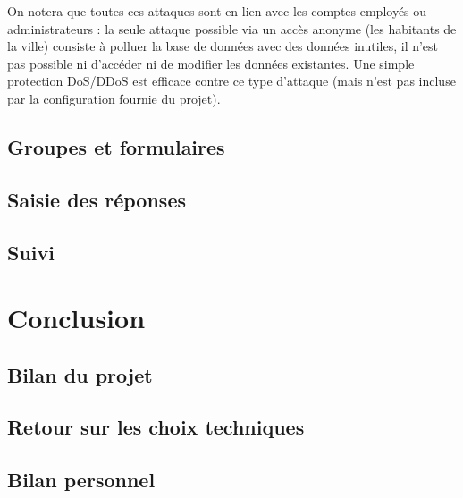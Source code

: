 \documentclass[11pt,french]{memoir}
\begin{document}
	On notera que toutes ces attaques sont en lien avec les comptes employés ou administrateurs : la seule attaque possible via un accès anonyme (les habitants de la ville) consiste à polluer la base de données avec des données inutiles, il n’est pas possible ni d’accéder ni de modifier les données existantes.
	Une simple protection DoS/DDoS est efficace contre ce type d'attaque (mais n'est pas incluse par la configuration fournie du projet).


	\section{Groupes et formulaires}\label{sec:groupes-et-formulaires}


	\section{Saisie des réponses}\label{sec:saisie-des-reponses}


	\section{Suivi}\label{sec:suivi}


	\chapter{Conclusion}\label{ch:conclusion}


	\section{Bilan du projet}\label{sec:bilan-du-projet}


	\section{Retour sur les choix techniques}\label{sec:retour-sur-les-choix-techniques}


	\section{Bilan personnel}\label{sec:bilan-personnel}
\end{document}
